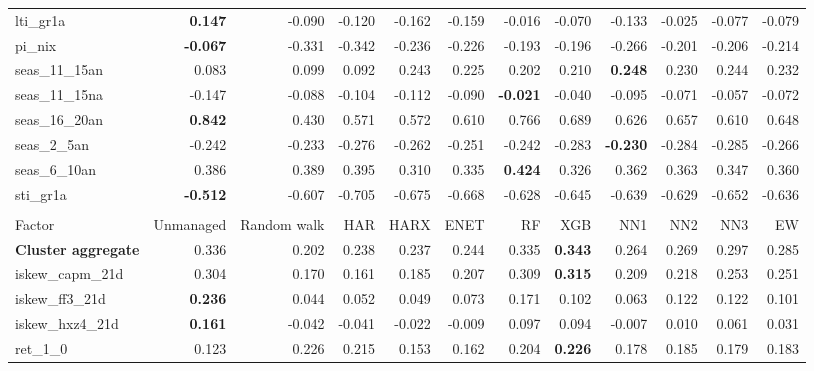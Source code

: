 \begin{landscape}
\begin{longtable}{>{\raggedright\arraybackslash}p{2.6cm}rrrrrrrrrrr}
lti\_gr1a & \textbf{0.147} & -0.090 & -0.120 & -0.162 & -0.159 & -0.016 & -0.070 & -0.133 & -0.025 & -0.077 & -0.079 \\
pi\_nix & \textbf{-0.067} & -0.331 & -0.342 & -0.236 & -0.226 & -0.193 & -0.196 & -0.266 & -0.201 & -0.206 & -0.214 \\
seas\_11\_15an & 0.083 & 0.099 & 0.092 & \cellcolor{blue!10}0.243 & \cellcolor{blue!10}0.225 & \cellcolor{blue!10}0.202 & \cellcolor{blue!10}0.210 & \textbf{\cellcolor{blue!10}0.248} & \cellcolor{blue!10}0.230 & \cellcolor{blue!10}0.244 & \cellcolor{blue!10}0.232 \\
seas\_11\_15na & -0.147 & -0.088 & -0.104 & -0.112 & -0.090 & \textbf{\cellcolor{blue!10}-0.021} & \cellcolor{blue!10}-0.040 & -0.095 & \cellcolor{blue!10}-0.071 & \cellcolor{blue!10}-0.057 & \cellcolor{blue!10}-0.072 \\
seas\_16\_20an & \textbf{0.842} & 0.430 & 0.571 & 0.572 & 0.610 & 0.766 & 0.689 & 0.626 & 0.657 & 0.610 & 0.648 \\
seas\_2\_5an & -0.242 & -0.233 & -0.276 & -0.262 & -0.251 & -0.242 & -0.283 & \textbf{\cellcolor{blue!10}-0.230} & -0.284 & -0.285 & -0.266 \\
seas\_6\_10an & 0.386 & 0.389 & \cellcolor{blue!10}0.395 & 0.310 & 0.335 & \textbf{\cellcolor{blue!10}0.424} & 0.326 & 0.362 & 0.363 & 0.347 & 0.360 \\
sti\_gr1a & \textbf{-0.512} & -0.607 & -0.705 & -0.675 & -0.668 & -0.628 & -0.645 & -0.639 & -0.629 & -0.652 & -0.636 \\
\hline
\multicolumn{12}{@{}l}{\textit{Panel K. Short-Term Reversal}} \\
\hline
Factor & Unmanaged & Random walk & HAR & HARX & ENET & RF & XGB & NN1 & NN2 & NN3 & EW \\
\hline
\textbf{Cluster aggregate} & 0.336 & 0.202 & 0.238 & 0.237 & 0.244 & 0.335 & \textbf{\cellcolor{blue!10}0.343} & 0.264 & 0.269 & 0.297 & 0.285 \\
iskew\_capm\_21d & 0.304 & 0.170 & 0.161 & 0.185 & 0.207 & \cellcolor{blue!10}0.309 & \textbf{\cellcolor{blue!10}0.315} & 0.209 & 0.218 & 0.253 & 0.251 \\
iskew\_ff3\_21d & \textbf{0.236} & 0.044 & 0.052 & 0.049 & 0.073 & 0.171 & 0.102 & 0.063 & 0.122 & 0.122 & 0.101 \\
iskew\_hxz4\_21d & \textbf{0.161} & -0.042 & -0.041 & -0.022 & -0.009 & 0.097 & 0.094 & -0.007 & 0.010 & 0.061 & 0.031 \\
ret\_1\_0 & 0.123 & 0.226 & 0.215 & 0.153 & 0.162 & 0.204 & \textbf{\cellcolor{blue!10}0.226} & 0.178 & 0.185 & 0.179 & 0.183 \\

\end{longtable}
\end{landscape}
